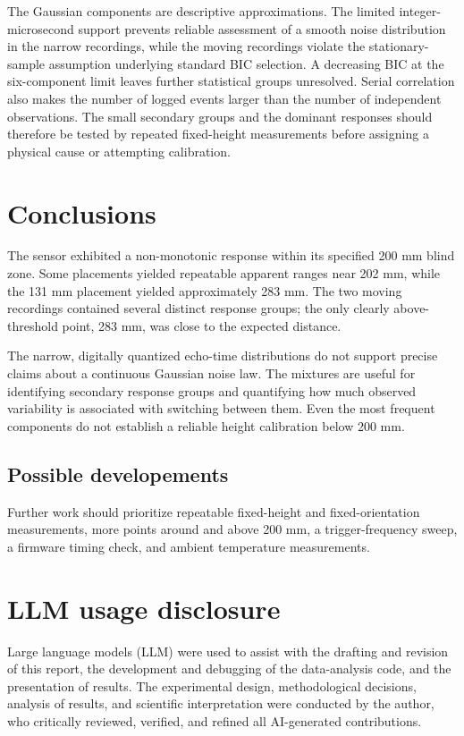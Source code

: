 \documentclass[11pt,a4paper]{article}
\begin{document}
The Gaussian components are descriptive approximations. The limited
integer-microsecond support prevents reliable assessment of a smooth
noise distribution in the narrow recordings, while the moving recordings
violate the stationary-sample assumption underlying standard BIC
selection. A decreasing BIC at the six-component limit leaves further
statistical groups unresolved. Serial correlation also makes the
number of logged events larger than the number of independent
observations. The small secondary groups and the dominant responses
should therefore be tested by repeated fixed-height measurements
before assigning a physical cause or attempting calibration.
\section{Conclusions}
\label{sec:orgde04e85}
The sensor exhibited a non-monotonic response within its specified 200 mm blind zone. Some placements yielded repeatable apparent ranges near 202 mm, while the 131 mm placement yielded approximately 283 mm.  The two moving recordings contained several distinct response groups; the only clearly above-threshold point, 283 mm, was close to the expected distance.

The narrow, digitally quantized echo-time distributions do not support precise claims about a continuous Gaussian noise law. The mixtures are useful for identifying secondary response groups and quantifying how much observed variability is associated with switching between them.  Even the most frequent components do not establish a reliable height calibration below 200 mm.
\subsection{Possible developements}
\label{sec:org983095b}
Further work should prioritize repeatable fixed-height and fixed-orientation measurements, more points around and above 200 mm, a trigger-frequency sweep, a firmware timing check, and ambient temperature measurements.
\section*{LLM usage disclosure}
\label{sec:org3a4aa38}
Large language models (LLM) were used to assist with the drafting and revision of this report, the development and debugging of the data-analysis code, and the presentation of results. The experimental design, methodological decisions, analysis of results, and scientific interpretation were conducted by the author, who critically reviewed, verified, and refined all AI-generated contributions.
\end{document}
